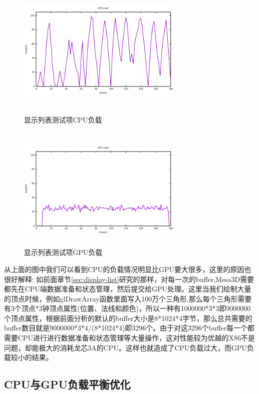\begin{figure}[H]
  \begin{minipage}[t]{0.5\linewidth} 
  \centering
  \includegraphics[width=8cm,height=6cm]{figures/gnuplot/dsp/cpu-load}
  \caption{显示列表测试项CPU负载}
  \label{fig:cpu-load-dsp}
  \end{minipage}
  \begin{minipage}[t]{0.5\linewidth} 
  \centering
  \includegraphics[width=8cm,height=6cm]{figures/gnuplot/dsp/gpu-load}
  \caption{显示列表测试项GPU负载}
  \label{fig:gpu-load-dsp}
  \end{minipage}
\end{figure}

从上面的图中我们可以看到CPU的负载情况明显比GPU要大很多，这里的原因也很好解释: 如前面章节\ref{sec:display-list}研究的那样，对每一次的buffer,Mesa3D需要都先在CPU端数据准备和状态管理，然后提交给GPU处理。这里当我们绘制大量的顶点时候，例如glDrawArray函数里面写入100万个三角形,那么每个三角形需要有3个顶点*3钟顶点属性(位置、法线和颜色)，所以一种有1000000*3*3即9000000个顶点属性，根据前面分析的默认的buffer大小是8*1024*4字节，那么总共需要的buffer数目就是9000000*3*4/(8*1024*4)即3296个。由于对这3296个buffer每一个都需要CPU进行进行数据准备和状态管理等大量操作，这对性能较为优越的X86不是问题，却能极大的消耗龙芯3A的CPU。这样也就造成了CPU负载过大，而GPU负载较小的结果。


\subsection{CPU与GPU负载平衡优化}

